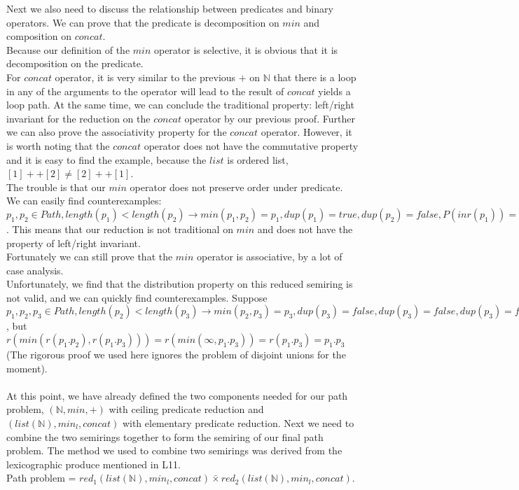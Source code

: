 \documentclass[a4paper,10pt]{article}
\begin{document}
Next we also need to discuss the relationship between predicates and binary operators. 
We can prove that the predicate is decomposition on $min$ and composition on $concat$. \\
Because our definition of the $min$ operator is selective, it is obvious that it is decomposition on the predicate. \\
For $concat$ operator, it is very similar to the previous $+$ on $\mathbb{N}$ that there is a loop in any of the arguments to the operator will lead to the result of $concat$ yields a loop path. At the same time, we can conclude the traditional property: left/right invariant for the reduction on the $concat$ operator by our previous proof. 
Further we can also prove the associativity property for the $concat$ operator. 
However, it is worth noting that the $concat$ operator does not have the commutative property and it is easy to find the example, because the $list$ is ordered list, $[1] ++ [2] \neq [2] ++ [1]$.\\
The trouble is that our $min$ operator does not preserve order under predicate. 
We can easily find counterexamples: $p_1,p_2 \in Path, length (p_1) < length(p_2) \rightarrow min(p_1,p_2) = p_1, dup(p_1) = true, dup(p_2) = false, P(inr(p_1)) = true, P(inr(p_2)) = false$. 
This means that our reduction is not traditional on $min$ and does not have the property of left/right invariant.\\
Fortunately we can still prove that the $min$ operator is associative, by a lot of case analysis.\\
Unfortunately, we find that the distribution property on this reduced semiring is not valid, and we can quickly find counterexamples.
Suppose $p_1,p_2,p_3 \in Path, length (p_2) < length(p_3) \rightarrow min(p_2,p_3) = p_3, dup(p_3) = false,dup(p_3) = false,dup(p_3) = false,dup(p_1 . p_2) = true,dup(p_1 . p_3) = false, r(p_1 . r(min (p_2,p_3))) = r(p_1 . r(p_2)) = r(p_1 . p_2) = \infty$, but $r(min(r(p_1 . p_2),r(p_1 . p_3))) = r(min(\infty,p_1 . p_3)) = r(p_1 . p_3) = p_1 . p_3$ (The rigorous proof we used here ignores the problem of disjoint unions for the moment).\\\\
At this point, we have already defined the two components needed for our path problem, $(\mathbb{N},min,+)$ with ceiling predicate reduction and $(list(\mathbb{N}),min_l,concat)$ with elementary predicate reduction. Next we need to combine the two semirings together to form the semiring of our final path problem. The method we used to combine two semirings was derived from the lexicographic produce mentioned in L11.\\ Path problem = $red_1 (list(\mathbb{N}),min_l,concat) \bar{\times} red_2 (list(\mathbb{N}),min_l,concat)$.\\
\end{document}
